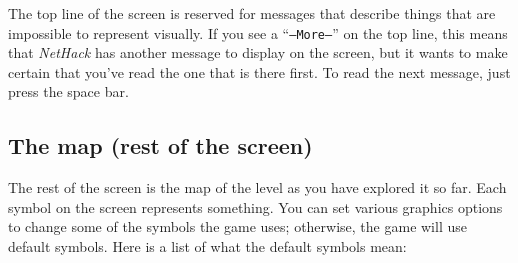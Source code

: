 The top line of the screen is reserved for messages that describe
things that are impossible to represent visually.  If you see a
``{\tt --More--}'' on the top line, this means that {\it NetHack\/} has
another message to display on the screen, but it wants to make certain
that you've read the one that is there first.  To read the next message,
just press the space bar.

\subsection*{The map (rest of the screen)}

The rest of the screen is the map of the level as you have explored it
so far.  Each symbol on the screen represents something.  You can set
various graphics
options to change some of the symbols the game uses; otherwise, the
game will use default symbols.  Here is a list of what the default
symbols mean:

